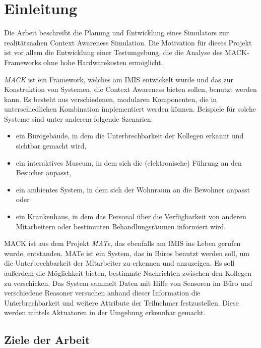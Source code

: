 \chapter{Einleitung}\label{chapter:introduction}


Die Arbeit beschreibt die Planung und Entwicklung eines Simulators zur realitätsnahen Context Awareness Simulation. Die Motivation für dieses Projekt ist vor allem die Entwicklung einer Testumgebung, die die Analyse des MACK-Frameworks ohne hohe Hardwarekosten ermöglicht.

\emph{MACK} ist ein Framework, welches am IMIS entwickelt wurde und das zur Konstruktion von Systemen, die Context Awareness bieten sollen, benutzt werden kann. Es besteht aus verschiedenen, modularen Komponenten, die in unterschiedlichen Kombination implementiert werden können. Beispiele für solche Systeme sind unter anderem folgende Szenarien:
\begin{itemize}
\item ein Bürogebäude, in dem die Unterbrechbarkeit der Kollegen erkannt und sichtbar gemacht wird,
\item ein interaktives Museum, in dem sich die (elektronische) Führung an den Besucher anpasst,
\item ein ambientes System, in dem sich der Wohnraum an die Bewohner anpasst oder
\item ein Krankenhaus, in dem das Personal über die Verfügbarkeit von anderen Mitarbeitern oder bestimmten Behandlungsräumen informiert wird.
\end{itemize}
MACK ist aus dem Projekt \emph{MATe}, das ebenfalls am IMIS ins Leben gerufen wurde, entstanden. MATe ist ein System, das in Büros benutzt werden soll, um die Unterbrechbarkeit der Mitarbeiter zu erkennen und anzuzeigen. Es soll außerdem die Möglichkeit bieten, bestimmte Nachrichten zwischen den Kollegen zu verschicken. Das System sammelt Daten mit Hilfe von Sensoren im Büro und verschiedene Reasoner versuchen anhand dieser Information die Unterbrechbarkeit und weitere Attribute der Teilnehmer festzustellen. Diese werden mittels Aktuatoren in der Umgebung erkennbar gemacht.

\section{Ziele der Arbeit}\label{sec:goals}

